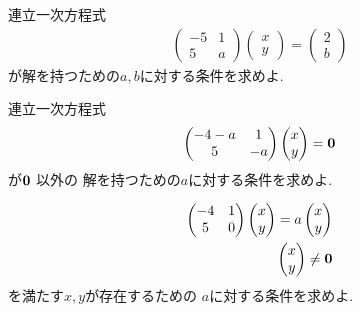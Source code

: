 \begin{quiz}
  連立一次方程式
  \begin{align*}
    \begin{pmatrix}-5&1\\5&a\end{pmatrix}
    \begin{pmatrix}x\\y\end{pmatrix}
      =
      \begin{pmatrix}2\\b\end{pmatrix}
  \end{align*}
  が解を持つための$a,b$に対する条件を求めよ.
\end{quiz}


\begin{quiz}
  \label{quiz:3:6}
  連立一次方程式
  \begin{align*}
    \begin{pmatrix}-4-a&1\\5&-a\end{pmatrix}
    \begin{pmatrix}x\\y\end{pmatrix}
      =
      \boldsymbol{0}
  \end{align*}
  が$\boldsymbol{0}$
  以外の
  解を持つための$a$に対する条件を求めよ.
\end{quiz}


\begin{quiz}
  \label{quiz:3:7}
  \begin{align*}
    \begin{pmatrix}-4&1\\5&0\end{pmatrix}
    \begin{pmatrix}x\\y\end{pmatrix}
      =
      a\begin{pmatrix}x\\y\end{pmatrix}\\
      \begin{pmatrix}x\\y\end{pmatrix}\neq \boldsymbol{0}
  \end{align*}
  を満たす$x,y$が存在するための
  $a$に対する条件を求めよ.
\end{quiz}


